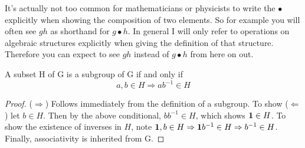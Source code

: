 It's actually not too common for mathematicians or physicists to write the
$\bullet$ explicitly when showing the composition of two elements. So for
example you will often see $gh$ as shorthand for $g\bullet h$. In general I will
only refer to operations on algebraic structures explicitly when giving the
definition of that structure. Therefore you can expect to see $gh$ instead of
$g\bullet h$ from here on out.

\begin{proposition}{}{}
  A subset H of G is a subgroup of G if and only if
  $$a,b\in H\Rightarrow ab^{-1}\in H$$
  \begin{proof}
    ($\Rightarrow$) Follows immediately from the definition of a subgroup. To 
    show ($\Leftarrow$) let $b\in H$. Then by the above conditional, $bb^{-1}
    \in H$, which shows ${\mathbf 1}\in H$. To show the existence of inverses in $H$, 
    note ${\mathbf 1},b\in H\Rightarrow {\mathbf 1} b^{-1}\in H\Rightarrow b^{-1}\in H$. 
    Finally, associativity is inherited from G.
  \end{proof}
\end{proposition}

